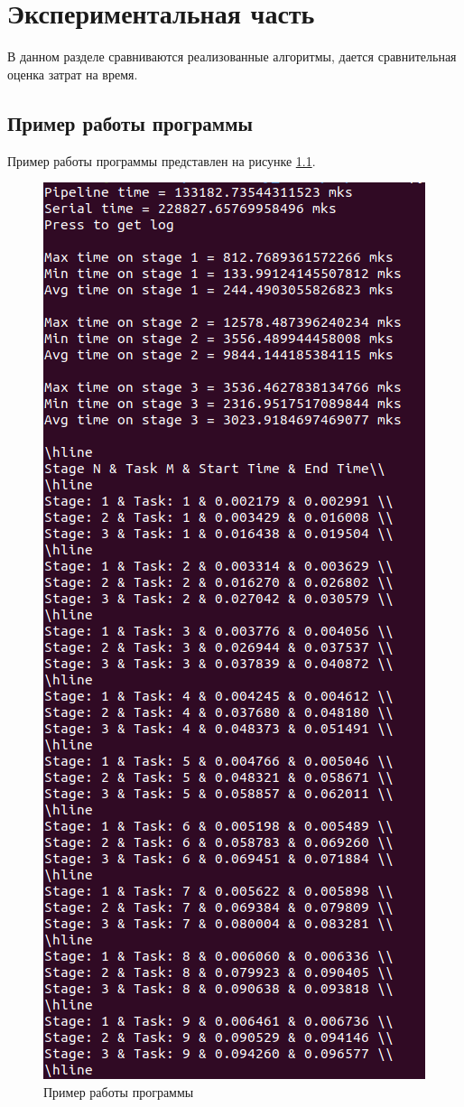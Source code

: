 \documentclass[a4paper,oneside,14pt]{extreport}
\begin{document}
\chapter{Экспериментальная часть}
В данном разделе сравниваются реализованные алгоритмы, дается сравнительная оценка затрат на время.

\section{Пример работы программы}
Пример работы программы представлен на рисунке \ref{fig:ex}.
\captionsetup{singlelinecheck=true}
\begin{figure}[H]
	\centering
	\includegraphics[width=0.62\linewidth]{images/example}
	\caption{Пример работы программы}
	\label{fig:ex}
\end{figure}
\end{document}

